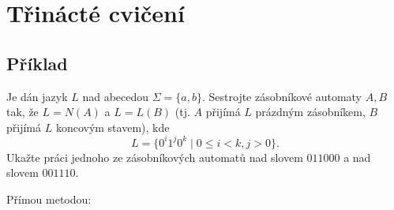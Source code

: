 \setlength{\abovedisplayskip}{0pt}
\setlength{\belowdisplayskip}{0pt}
\setlength{\abovedisplayshortskip}{0pt}
\setlength{\belowdisplayshortskip}{0pt}

\section{Třinácté cvičení}

\subsection{Příklad}
Je dán jazyk $L$ nad abecedou $\Sigma = \{a,b\}$. Sestrojte zásobníkové automaty $A,B$ tak, že $L = N(A)$ a $L = L(B)$
(tj. $A$ přijímá $L$ prázdným zásobníkem, $B$ přijímá $L$ koncovým stavem), kde
\[L = \{0^i 1^j 0^k \mid 0 \leq i < k, j > 0\}\text{.}\]
Ukažte práci jednoho ze zásobníkových automatů nad slovem $011000$ a nad slovem $001110$.

Přímou metodou:

